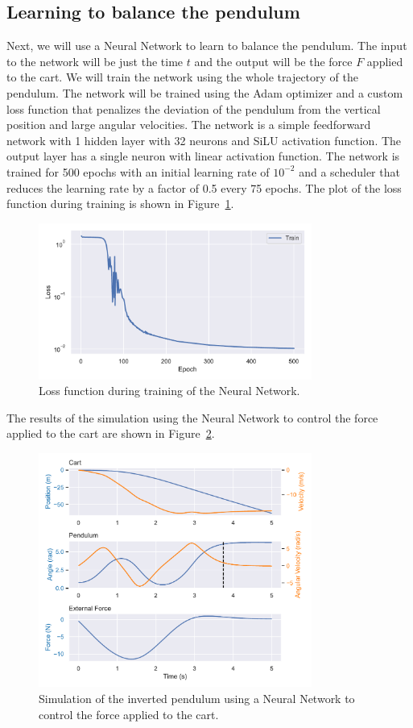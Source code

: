 \documentclass[unicode,11pt,a4paper,oneside,numbers=endperiod,openany]{scrartcl}
\begin{document}
\subsection*{Learning to balance the pendulum}
Next, we will use a Neural Network to learn to balance the pendulum. The input
to the network will be just the time $t$ and the output will be the force $F$
applied to the cart. We will train the network using the whole trajectory of the
pendulum. The network will be trained using the Adam optimizer and a custom loss
function that penalizes the deviation of the pendulum from the vertical position
and large angular velocities. The network is a simple feedforward network with
1 hidden layer with 32 neurons and SiLU activation function. The output layer
has a single neuron with linear activation function. The network is trained for
500 epochs with an initial learning rate of $10^{-2}$ and a scheduler that
reduces the learning rate by a factor of 0.5 every 75 epochs.
The plot of the loss function during training is shown in Figure~\ref{fig:loss}.
\begin{figure}[h]
    \centering
    \includegraphics[width=0.8\textwidth]{../Task1/loss_function.pdf}
    \caption{Loss function during training of the Neural Network.}
    \label{fig:loss}
\end{figure}
The results of the simulation using the Neural Network to control the force
applied to the cart are shown in Figure~\ref{fig:pendulum_nn}.
\begin{figure}[h]
    \centering
    \includegraphics[width=0.8\textwidth]{../Task1/pendulum_nn.pdf}
    \caption{Simulation of the inverted pendulum using a Neural Network to
    control the force applied to the cart.}
    \label{fig:pendulum_nn}
\end{figure}
\end{document}
